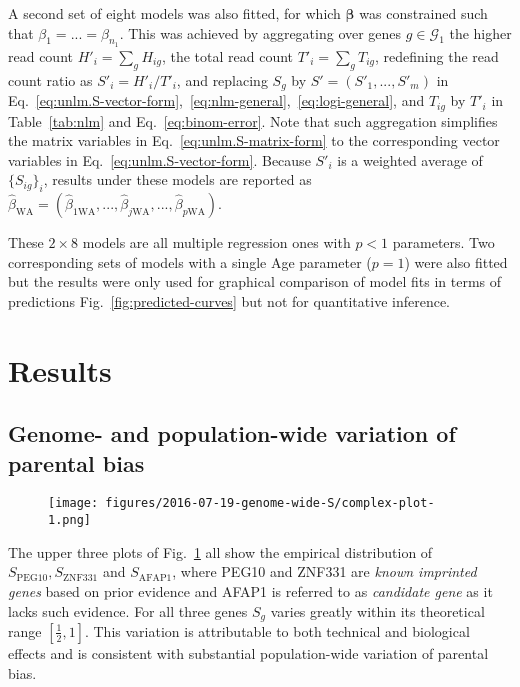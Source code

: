 \documentclass[letterpaper]{article}
\begin{document}
A second set of eight models was also
fitted, for which \(\boldsymbol{\beta}\) was constrained such that \(\beta_1 =
... = \beta_{n_1}\).  This was achieved by aggregating over genes
\(g\in\mathcal{G}_1\) the higher read count \(H'_i = \sum_g H_{ig}\), the
total read count \(T'_i = \sum_g T_{ig}\), redefining the read count ratio
as \(S'_i = H'_i / T'_i\), and replacing \(S_g\) by \(S'=(S'_1,...,S'_m)\) in
Eq.~\ref{eq:unlm.S-vector-form},~\ref{eq:nlm-general},~\ref{eq:logi-general}, and \(T_{ig}\) by \(T'_i\) in
Table~\ref{tab:nlm} and Eq.~\ref{eq:binom-error}.  Note that such aggregation
simplifies the matrix variables in Eq.~\ref{eq:unlm.S-matrix-form} to the
corresponding vector variables in Eq.~\ref{eq:unlm.S-vector-form}.  Because \(S'_i\) is a
weighted average of \(\{S_{ig}\}_i\), results under these models are reported
as \(\hat{\beta}_\mathrm{WA} =
(\hat{\beta}_{1\mathrm{WA}},...,\hat{\beta}_{j\mathrm{WA}},...,\hat{\beta}_{p\mathrm{WA}})\).

These \(2\times 8\) models are all multiple regression ones with \(p<1\)
parameters.  Two corresponding sets of models with a single Age parameter
(\(p=1\)) were also fitted but the results were only used for graphical
comparison of model fits in terms of predictions
Fig.~\ref{fig:predicted-curves} but not for quantitative inference.

\section{Results}

\subsection{Genome- and population-wide variation of parental bias}

\begin{figure}
\begin{center}
\texttt{[image: figures/2016-07-19-genome-wide-S/complex-plot-1.png]}
\end{center}
\caption{}
\label{fig:ranking-genes}
\end{figure}

The upper three plots of Fig.~\ref{fig:ranking-genes} all show the empirical distribution
of \(S_\mathrm{PEG10}, S_\mathrm{ZNF331}\) and \(S_\mathrm{AFAP1}\), where
PEG10 and ZNF331 are \emph{known imprinted genes} based on prior evidence and
AFAP1 is referred to as \emph{candidate gene} as it lacks such evidence.  For
all three genes \(S_g\) varies greatly within its theoretical range
\([\frac{1}{2}, 1]\).  This variation is attributable to both technical and biological effects
and is consistent with substantial population-wide variation of parental bias.
\end{document}
